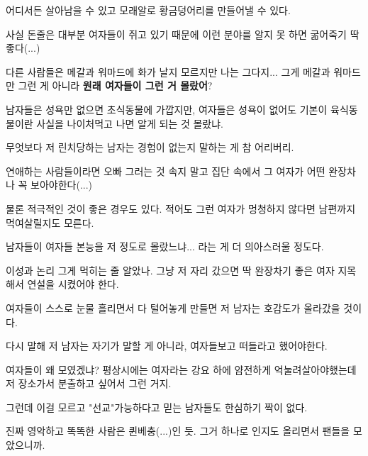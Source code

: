 어디서든 살아남을 수 있고 모래알로 황금덩어리를 만들어낼 수 있다.
\vspace{5mm}

사실 돈줄은 대부분 여자들이 쥐고 있기 때문에 이런 분야를 알지 못 하면 굶어죽기 딱 좋다(...)
\vspace{5mm}

다른 사람들은 메갈과 워마드에 화가 날지 모르지만 나는 그다지... 그게 메갈과 워마드만 그런 게 아니라 \textbf{원래 여자들이 그런 거 몰랐어}?
\vspace{5mm}

남자들은 성욕만 없으면 초식동물에 가깝지만, 여자들은 성욕이 없어도 기본이 육식동물이란 사실을 나이처먹고 나면 알게 되는 것 몰랐냐.
\vspace{5mm}

무엇보다 저 린치당하는 남자는 경험이 없는지 말하는 게 참 어리버리.
\vspace{5mm}

연애하는 사람들이라면 오빠 그러는 것 속지 말고 집단 속에서 그 여자가 어떤 완장차나 꼭 보아야한다(...)
\vspace{5mm}

물론 적극적인 것이 좋은 경우도 있다. 적어도 그런 여자가 멍청하지 않다면 남편까지 먹여살릴지도 모른다.
\vspace{5mm}

남자들이 여자들 본능을 저 정도로 몰랐느냐... 라는 게 더 의아스러울 정도다.
\vspace{5mm}

이성과 논리 그게 먹히는 줄 알았나. 그냥 저 자리 갔으면 딱 완장차기 좋은 여자 지목해서 연설을 시켰어야 한다.
\vspace{5mm}

여자들이 스스로 눈물 흘리면서 다 털어놓게 만들면 저 남자는 호감도가 올라갔을 것이다.
\vspace{5mm}

다시 말해 저 남자는 자기가 말할 게 아니라, 여자들보고 떠들라고 했어야한다.
\vspace{5mm}

여자들이 왜 모였겠냐? 평상시에는 여자라는 강요 하에 얌전하게 억눌려살아야했는데 저 장소가서 분출하고 싶어서 그런 거지.
\vspace{5mm}

그런데 이걸 모르고 "선교"가능하다고 믿는 남자들도 한심하기 짝이 없다.
\vspace{5mm}

진짜 영악하고 똑똑한 사람은 퀸베충(...)인 듯. 그거 하나로 인지도 올리면서 팬들을 모았으니까.
\vspace{5mm}

